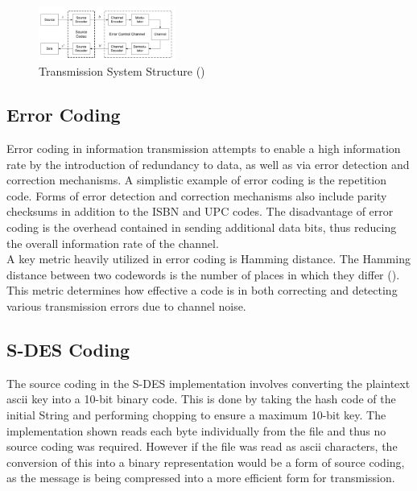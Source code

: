 \documentclass[]{article}
\begin{document}
\begin{figure}[H]
	\begin{center}
		\includegraphics[height=0.2\textheight,width=0.4\textwidth]{source_coding.png}
		\caption{Transmission System Structure (\cite{source_coding})}
		\label{fig:trans}		
	\end{center}
\end{figure}

\subsection*{Error Coding}

Error coding in information transmission attempts to enable a high information rate by the introduction of redundancy to data, as well as via error detection and correction mechanisms. A simplistic example of error coding is the repetition code. Forms of error detection and correction mechanisms also include parity checksums in addition to the ISBN and UPC codes. The disadvantage of error coding is the overhead contained in sending additional data bits, thus reducing the overall information rate of the channel.\\

A key metric heavily utilized in error coding is Hamming distance. The Hamming distance between two codewords is the number of places in which they differ (\cite{lecture}). This metric determines how effective a code is in both correcting and detecting various transmission errors due to channel noise.

\subsection*{S-DES Coding}

The source coding in the S-DES implementation involves converting the plaintext ascii key into a 10-bit binary code. This is done by taking the hash code of the initial String and performing chopping to ensure a maximum 10-bit key. The implementation shown reads each byte individually from the file and thus no source coding was required. However if the file was read as ascii characters, the conversion of this into a binary representation would be a form of source coding, as the message is being compressed into a more efficient form for transmission.\\
\end{document}
